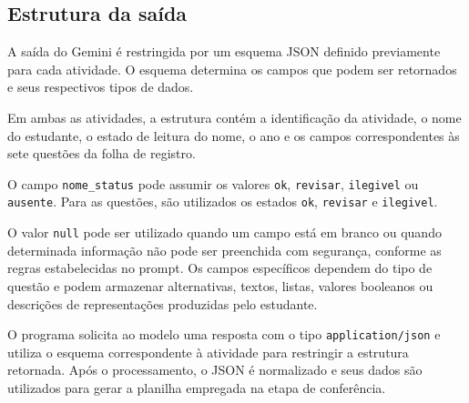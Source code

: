 \subsection*{Estrutura da saída}

A saída do Gemini é restringida por um esquema JSON definido
previamente para cada atividade. O esquema determina os campos que
podem ser retornados e seus respectivos tipos de dados.

Em ambas as atividades, a estrutura contém a identificação da
atividade, o nome do estudante, o estado de leitura do nome, o ano e
os campos correspondentes às sete questões da folha de registro.

O campo \texttt{nome\_status} pode assumir os valores
\texttt{ok}, \texttt{revisar}, \texttt{ilegivel} ou
\texttt{ausente}. Para as questões, são utilizados os estados
\texttt{ok}, \texttt{revisar} e \texttt{ilegivel}.

O valor \texttt{null} pode ser utilizado quando um campo está em branco
ou quando determinada informação não pode ser preenchida com segurança,
conforme as regras estabelecidas no prompt. Os campos específicos
dependem do tipo de questão e podem armazenar alternativas, textos,
listas, valores booleanos ou descrições de representações produzidas
pelo estudante.

O programa solicita ao modelo uma resposta com o tipo
\texttt{application/json} e utiliza o esquema correspondente à
atividade para restringir a estrutura retornada. Após o processamento,
o JSON é normalizado e seus dados são utilizados para gerar a planilha
empregada na etapa de conferência.
